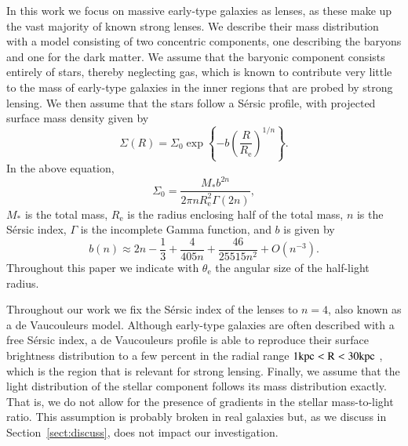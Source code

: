 \documentclass{aa}
\def\reff{R_{\mathrm{e}}}
\def\mstar{M_*}
\def\teff{\theta_{\mathrm{e}}}
\def\Sref#1{Section~\ref{#1}\xspace}
\begin{document}
In this work we focus on massive early-type galaxies as lenses, as these make up the vast majority of known strong lenses.
We describe their mass distribution with a model consisting of two concentric components, one describing the baryons and one for the dark matter.
We assume that the baryonic component consists entirely of stars, thereby neglecting gas, which is known to contribute very little to the mass of early-type galaxies in the inner regions that are probed by strong lensing. 
We then assume that the stars follow a S\'{e}rsic profile, with %
projected surface mass density given by
\begin{equation}
\Sigma(R) = \Sigma_0 \exp{\left\{-b\left(\frac{R}{\reff}\right)^{1/n}\right\}}.
\end{equation}
In the above equation,
\begin{equation}
\Sigma_0 = \frac{\mstar b^{2n}}{2\pi n \reff^2 \Gamma(2n)},
\end{equation}
$\mstar$ is the total mass, $\reff$ is the radius enclosing half of the total mass, $n$ is the S\'{e}rsic index, $\Gamma$ is the incomplete Gamma function, and $b$ is given by \citep{C+B99}
\begin{equation}
b(n) \approx 2n -\frac13 + \frac{4}{405n} + \frac{46}{25515n^2} + O(n^{-3}).
\end{equation}
Throughout this paper we indicate with $\teff$ the angular size of the half-light radius.

Throughout our work we fix the S\'{e}rsic index of the lenses to $n=4$, also known as a de Vaucouleurs model.
Although early-type galaxies are often described with a free S\'{e}rsic index, a de Vaucouleurs profile is able to reproduce their surface brightness distribution to a few percent in the radial range $1\rm{kpc} < R < 30\rm{kpc}$ \citep[see e.g.][]{Son20}, which is the region that is relevant for strong lensing.
Finally, we assume that the light distribution of the stellar component follows its mass distribution exactly. That is, we do not allow for the presence of gradients in the stellar mass-to-light ratio. This assumption is probably broken in real galaxies but, as we discuss in \Sref{sect:discuss}, does not impact our investigation.
\end{document}
